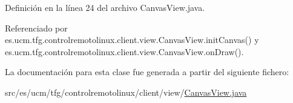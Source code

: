Definición en la línea 24 del archivo Canvas\-View.\-java.



Referenciado por es.\-ucm.\-tfg.\-controlremotolinux.\-client.\-view.\-Canvas\-View.\-init\-Canvas() y es.\-ucm.\-tfg.\-controlremotolinux.\-client.\-view.\-Canvas\-View.\-on\-Draw().



La documentación para esta clase fue generada a partir del siguiente fichero\-:\begin{DoxyCompactItemize}
\item 
src/es/ucm/tfg/controlremotolinux/client/view/\hyperlink{CanvasView_8java}{Canvas\-View.\-java}\end{DoxyCompactItemize}
